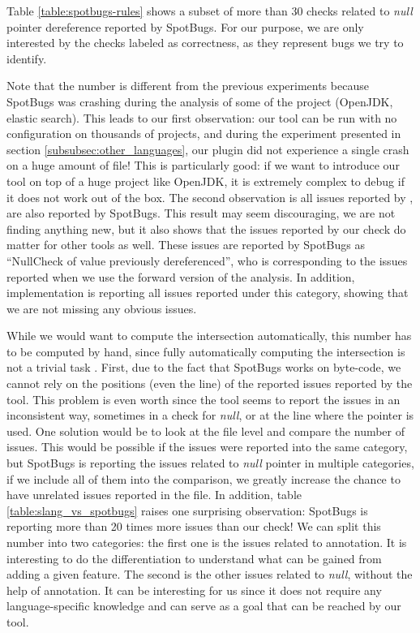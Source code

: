 Table \ref{table:spotbugs-rules} shows a subset of more than 30 checks related to \emph{null} pointer dereference reported by SpotBugs. 
For our purpose, we are only interested by the checks labeled as correctness, as they represent bugs we try to identify.

Note that the number is different from the previous experiments because SpotBugs was crashing during the analysis of some of the project (OpenJDK, elastic search). 
This leads to our first observation: our tool can be run with no configuration on thousands of projects, and during the experiment presented in section \ref{subsubsec:other_languages}, our plugin did not experience a single crash on a huge amount of file!
This is particularly good: if we want to introduce our tool on top of a huge project like OpenJDK, it is extremely complex to debug if it does not work out of the box.
The second observation is all issues reported by \slang{}, are also reported by SpotBugs. 
This result may seem discouraging, we are not finding anything new, but it also shows that the issues reported by our check do matter for other tools as well. 
These issues are reported by SpotBugs as ``NullCheck of value previously dereferenced'', who is corresponding to the issues reported when we use the forward version of the analysis. 
In addition, \slang{} implementation is reporting all issues reported under this category, showing that we are not missing any obvious issues.

While we would want to compute the intersection automatically, this number has to be computed by hand, since fully automatically computing the intersection is not a trivial task \cite{Gabel:2010:OIE:1806799.1806806}. 
First, due to the fact that SpotBugs works on byte-code, we cannot rely on the positions (even the line) of the reported issues reported by the tool. 
This problem is even worth since the tool seems to report the issues in an inconsistent way, sometimes in a check for \emph{null}, or at the line where the pointer is used. 
One solution would be to look at the file level and compare the number of issues. 
This would be possible if the issues were reported into the same category, but SpotBugs is reporting the issues related to \emph{null} pointer in multiple categories, if we include all of them into the comparison, we greatly increase the chance to have unrelated issues reported in the file. \newline
In addition, table \ref{table:slang_vs_spotbugs} raises one surprising observation: SpotBugs is reporting more than 20 times more issues than our check!
We can split this number into two categories: the first one is the issues related to annotation. 
It is interesting to do the differentiation to understand what can be gained from adding a given feature. 
The second is the other issues related to \emph{null}, without the help of annotation. 
It can be interesting for us since it does not require any language-specific knowledge and can serve as a goal that can be reached by our tool.



